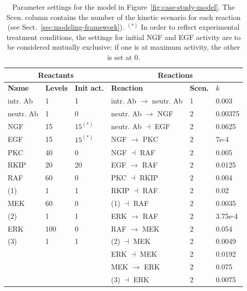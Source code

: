 \documentclass[journal, 10pt]{IEEEtran}
\begin{document}
\begin{table}[htb]
\begin{center}
\caption{Parameter settings for the model in Figure~\ref{fig:case-study-model}.
The Scen. column contains the number of the kinetic scenario for each reaction (see Sect.~\ref{sec:modeling-framework}).
\ensuremath{^{(*)}} In order to reflect experimental treatment conditions, the settings for initial NGF and EGF activity
are to be considered mutually exclusive: if one is at maximum activity, the other is set at 0.}\label{tab:case-study-parameters}
\scriptsize
  \begin{tabular}{|l|l|l||l|l|l|}
   \hline
    \multicolumn{3}{|c||}{\bf Reactants} & \multicolumn{3}{c|}{\bf Reactions}\\
    \hline
    \hline
    {\bf Name} & {\bf Levels} & {\bf Init act.} & {\bf Reaction} & {\bf Scen.} & $k$\\
    \hline
    intr. Ab & 1 & 1 & intr. Ab $\rightarrow$ neutr. Ab & 1 & 0.003\\
    \hline
    neutr. Ab & 1 & 0 & neutr. Ab $\rightarrow$ NGF & 2 & 0.00375\\
    \hline
    NGF & 15 & $15^{(*)}$ & neutr. Ab $\dashv$ EGF & 2 & 0.0625\\
    \hline
    EGF & 15 & $15^{(*)}$ & NGF $\rightarrow$ PKC & 2 & 7e-4\\
    \hline
    PKC & 40 & 0 & NGF $\dashv$ RAF & 2 & 0.005\\
    \hline
    RKIP & 20 & 20 & EGF $\rightarrow$ RAF & 2 & 0.0125\\
    \hline
    RAF & 60 & 0 & PKC $\dashv$ RKIP & 2 & 0.004\\
    \hline
    (1) & 1 & 1 & RKIP $\dashv$ RAF & 2 & 0.02\\
    \hline
    MEK & 60 & 0 & (1) $\dashv$ RAF & 2 & 0.0035\\
    \hline
    (2) & 1 & 1 & ERK $\rightarrow$ RAF & 2 & 3.75e-4\\
    \hline
    ERK & 100 & 0 & RAF $\rightarrow$ MEK & 2 & 0.054\\
    \hline
    (3) & 1 & 1 & (2) $\dashv$ MEK & 2 & 0.0049\\
    \hline
     & & & ERK $\dashv$ MEK & 2 & 0.0192\\
    \hline
     & & & MEK $\rightarrow$ ERK & 2 & 0.075\\
    \hline
     & & & (3) $\dashv$ ERK & 2 & 0.0075\\
    \hline
  \end{tabular}
\end{center}
\end{table}
\end{document}
